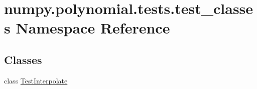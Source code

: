 \hypertarget{namespacenumpy_1_1polynomial_1_1tests_1_1test__classes}{}\section{numpy.\+polynomial.\+tests.\+test\+\_\+classes Namespace Reference}
\label{namespacenumpy_1_1polynomial_1_1tests_1_1test__classes}
\subsection*{Classes}
\begin{DoxyCompactItemize}
\item 
class \hyperlink{classnumpy_1_1polynomial_1_1tests_1_1test__classes_1_1TestInterpolate}{Test\+Interpolate}
\end{DoxyCompactItemize}
